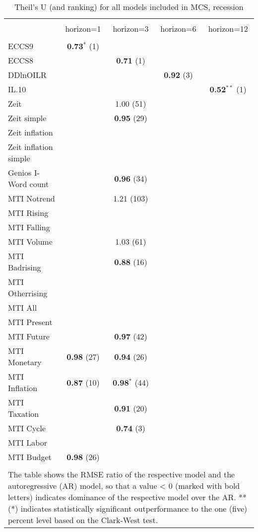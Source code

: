 
\begin{table}[!htbp] \centering 
  \caption{Theil's U (and ranking) for all models included in MCS, recession} 
  \label{} 
\scriptsize 
\begin{tabular}{@{\extracolsep{5pt}} lcccc} 
\\[-1.8ex]\hline 
\hline \\[-1.8ex] 
 & horizon=1 & horizon=3 & horizon=6 & horizon=12 \\ 
\hline \\[-1.8ex] 
ECCS9 & \textbf{0.73$^{*}$} (1) &  &  &  \\ 
ECCS8 &  & \textbf{0.71} (1) &  &  \\ 
DDlnOILR &  &  & \textbf{0.92} (3) &  \\ 
IL.10 &  &  &  & \textbf{0.52$^{**}$} (1) \\ 
Zeit &  & 1.00 (51) &  &  \\ 
Zeit simple &  & \textbf{0.95} (29) &  &  \\ 
Zeit inflation &  &  &  &  \\ 
Zeit inflation simple &  &  &  &  \\ 
Genios I-Word count &  & \textbf{0.96} (34) &  &  \\ 
MTI Notrend &  & 1.21 (103) &  &  \\ 
MTI Rising &  &  &  &  \\ 
MTI Falling &  &  &  &  \\ 
MTI Volume &  & 1.03 (61) &  &  \\ 
MTI Badrising &  & \textbf{0.88} (16) &  &  \\ 
MTI Otherrising &  &  &  &  \\ 
MTI All &  &  &  &  \\ 
MTI Present &  &  &  &  \\ 
MTI Future &  & \textbf{0.97} (42) &  &  \\ 
MTI Monetary & \textbf{0.98} (27) & \textbf{0.94} (26) &  &  \\ 
MTI Inflation & \textbf{0.87} (10) & \textbf{0.98$^{*}$} (44) &  &  \\ 
MTI Taxation &  & \textbf{0.91} (20) &  &  \\ 
MTI Cycle &  & \textbf{0.74} (3) &  &  \\ 
MTI Labor &  &  &  &  \\ 
MTI Budget & \textbf{0.98} (26) &  &  &  \\ 
\hline \\[-1.8ex] 
\multicolumn{5}{l}{The table shows the RMSE ratio of the 
              respective model and the autoregressive (AR) model,
              so that a value < 0 (marked with bold letters) 
              indicates dominance of the respective model over 
              the AR. ** (*) indicates 
              statistically significant outperformance 
              to the one (five) percent level based on the Clark-West test.} \\ 
\end{tabular} 
\end{table} 
